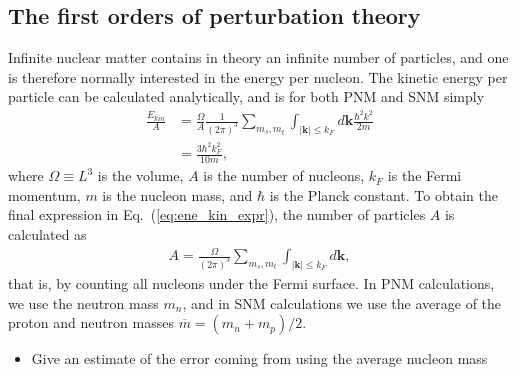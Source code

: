 \documentclass[a4paper,12pt]{report}
\begin{document}
\subsection{The first orders of perturbation theory}
  
Infinite nuclear matter contains in theory an infinite number of particles, 
and one is therefore normally interested in the energy per nucleon. 
The kinetic energy per particle can be calculated analytically, and is 
for both PNM and SNM simply
\begin{align}
  \frac{E_{kin}}{A} &= \frac{\Omega }{A}\frac{1}{(2\pi )^{3}}\sum_{m_{s},m_{t}}\int_{|\mathbf{k}|\leq k_{F}}d\mathbf{k}\frac{\hbar^{2}k^{2}}{2m} \nonumber \\
  &= \frac{3\hbar^{2}k_{F}^{2}}{10m},
  \label{eq:ene_kin_expr}
\end{align}
where $\Omega \equiv L^{3}$ is the volume, $A$ is the number of nucleons, $k_{F}$ is the Fermi momentum, $m$ is the nucleon mass, and $\hbar $ is the Planck constant. To obtain the final expression in Eq.~(\ref{eq:ene_kin_expr}), the number of particles $A$ is calculated as
\begin{align}
  A = \frac{\Omega }{(2\pi )^{3}}\sum_{m_{s}, m_{t}}\int_{|\mathbf{k}|\leq k_{F}}d\mathbf{k},
\end{align}
that is, by counting all nucleons under the Fermi surface. In PNM calculations,
we use the neutron mass $m_{n}$, and in SNM calculations we use the average 
of the proton and neutron masses $\overline{m}=(m_{n}+m_{p})/2$. 

\begin{itemize}
\item Give an estimate of the error coming from using the average nucleon mass
\end{itemize}
 
\end{document}
